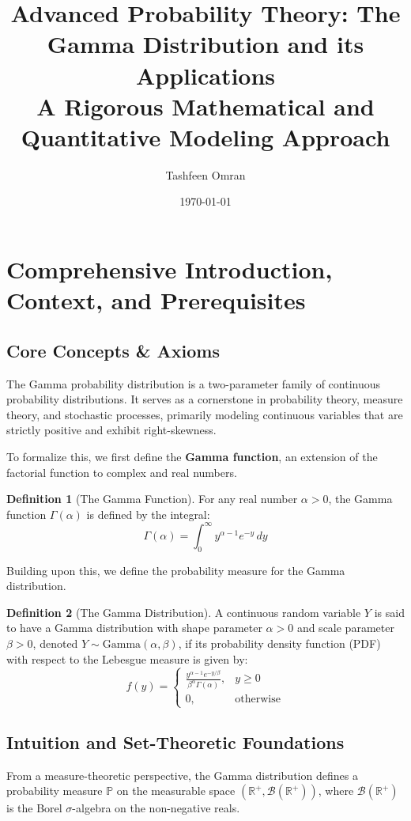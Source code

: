 \documentclass[11pt, a4paper]{article}
\title{\textbf{Advanced Probability Theory: The Gamma Distribution and its Applications}\\
\large A Rigorous Mathematical and Quantitative Modeling Approach}
\author{Tashfeen Omran}
\date{\today}
\theoremstyle{definition}
\newtheorem{definition}{Definition}[section]
\theoremstyle{remark}
\newcommand{\R}{\mathbb{R}}
\newcommand{\Prob}{\mathbb{P}}
\begin{document}
\maketitle
\tableofcontents
\newpage

\section{Comprehensive Introduction, Context, and Prerequisites}

\subsection{Core Concepts \& Axioms}
The Gamma probability distribution is a two-parameter family of continuous probability distributions. It serves as a cornerstone in probability theory, measure theory, and stochastic processes, primarily modeling continuous variables that are strictly positive and exhibit right-skewness. 

To formalize this, we first define the \textbf{Gamma function}, an extension of the factorial function to complex and real numbers.
\begin{definition}[The Gamma Function]
For any real number $\alpha > 0$, the Gamma function $\Gamma(\alpha)$ is defined by the integral:
\[ \Gamma(\alpha) = \int_0^\infty y^{\alpha-1} e^{-y} \, dy \]
\end{definition}

Building upon this, we define the probability measure for the Gamma distribution.
\begin{definition}[The Gamma Distribution]
A continuous random variable $Y$ is said to have a Gamma distribution with shape parameter $\alpha > 0$ and scale parameter $\beta > 0$, denoted $Y \sim \text{Gamma}(\alpha, \beta)$, if its probability density function (PDF) with respect to the Lebesgue measure is given by:
\[
f(y) = 
\begin{cases} 
\frac{y^{\alpha-1}e^{-y/\beta}}{\beta^\alpha \Gamma(\alpha)}, & y \ge 0 \\
0, & \text{otherwise}
\end{cases}
\]
\end{definition}

\subsection{Intuition and Set-Theoretic Foundations}
From a measure-theoretic perspective, the Gamma distribution defines a probability measure $\Prob$ on the measurable space $(\R^+, \mathcal{B}(\R^+))$, where $\mathcal{B}(\R^+)$ is the Borel $\sigma$-algebra on the non-negative reals. 
\end{document}
